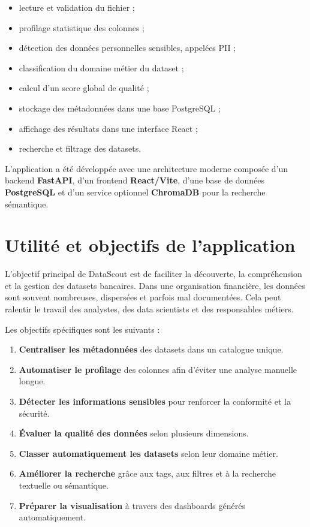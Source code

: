 \documentclass[12pt,a4paper]{report}
\begin{document}
\begin{itemize}
    \item lecture et validation du fichier ;
    \item profilage statistique des colonnes ;
    \item détection des données personnelles sensibles, appelées PII ;
    \item classification du domaine métier du dataset ;
    \item calcul d'un score global de qualité ;
    \item stockage des métadonnées dans une base PostgreSQL ;
    \item affichage des résultats dans une interface React ;
    \item recherche et filtrage des datasets.
\end{itemize}

L'application a été développée avec une architecture moderne composée d'un backend \textbf{FastAPI}, d'un frontend \textbf{React/Vite}, d'une base de données \textbf{PostgreSQL} et d'un service optionnel \textbf{ChromaDB} pour la recherche sémantique.

\section{Utilité et objectifs de l'application}

L'objectif principal de DataScout est de faciliter la découverte, la compréhension et la gestion des datasets bancaires. Dans une organisation financière, les données sont souvent nombreuses, dispersées et parfois mal documentées. Cela peut ralentir le travail des analystes, des data scientists et des responsables métiers.

Les objectifs spécifiques sont les suivants :

\begin{enumerate}
    \item \textbf{Centraliser les métadonnées} des datasets dans un catalogue unique.
    \item \textbf{Automatiser le profilage} des colonnes afin d'éviter une analyse manuelle longue.
    \item \textbf{Détecter les informations sensibles} pour renforcer la conformité et la sécurité.
    \item \textbf{Évaluer la qualité des données} selon plusieurs dimensions.
    \item \textbf{Classer automatiquement les datasets} selon leur domaine métier.
    \item \textbf{Améliorer la recherche} grâce aux tags, aux filtres et à la recherche textuelle ou sémantique.
    \item \textbf{Préparer la visualisation} à travers des dashboards générés automatiquement.
\end{enumerate}
\end{document}
